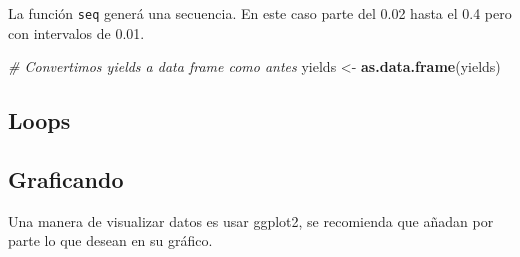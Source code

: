 \documentclass[12pt,]{book}
\newenvironment{Shaded}{\begin{snugshade}}{\end{snugshade}}
\newcommand{\KeywordTok}[1]{\textcolor[rgb]{0.13,0.29,0.53}{\textbf{#1}}}
\newcommand{\DecValTok}[1]{\textcolor[rgb]{0.00,0.00,0.81}{#1}}
\newcommand{\FloatTok}[1]{\textcolor[rgb]{0.00,0.00,0.81}{#1}}
\newcommand{\StringTok}[1]{\textcolor[rgb]{0.31,0.60,0.02}{#1}}
\newcommand{\CommentTok}[1]{\textcolor[rgb]{0.56,0.35,0.01}{\textit{#1}}}
\newcommand{\ControlFlowTok}[1]{\textcolor[rgb]{0.13,0.29,0.53}{\textbf{#1}}}
\newcommand{\OperatorTok}[1]{\textcolor[rgb]{0.81,0.36,0.00}{\textbf{#1}}}
\newcommand{\NormalTok}[1]{#1}
\begin{document}
La función \texttt{seq} generá una secuencia. En este caso parte del
0.02 hasta el 0.4 pero con intervalos de 0.01.

\begin{Shaded}
\begin{Highlighting}[]
\CommentTok{# Convertimos yields a data frame como antes }
\NormalTok{yields <-}\StringTok{ }\KeywordTok{as.data.frame}\NormalTok{(yields)}
\end{Highlighting}
\end{Shaded}

\subsection{Loops}\label{loops}

\begin{Shaded}
\end{Shaded}

\subsection{Graficando}\label{graficando}

Una manera de visualizar datos es usar ggplot2, se recomienda que añadan
por parte lo que desean en su gráfico.
\end{document}

